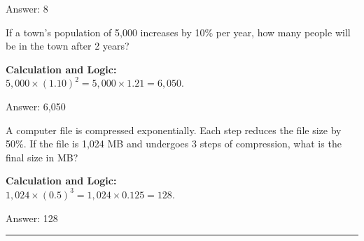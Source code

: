 \documentclass[11pt,paper=a4,answers]{exam}
\begin{document}
\begin{questions}
\begin{solution}
\vspace{25pt}

Answer: \colorbox{yellow!100}{8}
\end{solution}

\vspace{40pt}

\question
If a town's population of 5,000 increases by 10\% per year, how many people will be in the town after 2 years?

\begin{solution}
\textbf{Calculation and Logic:} \\
$5,000 \times (1.10)^2 = 5,000 \times 1.21 = 6,050$.

\vspace{25pt}

Answer: \colorbox{yellow!100}{6,050}
\end{solution}

\vspace{40pt}

\question
A computer file is compressed exponentially. Each step reduces the file size by 50\%. If the file is 1,024 MB and undergoes 3 steps of compression, what is the final size in MB?

\begin{solution}
\textbf{Calculation and Logic:} \\
$1,024 \times (0.5)^3 = 1,024 \times 0.125 = 128$.

\vspace{25pt}

Answer: \colorbox{yellow!100}{128}
\end{solution}



\end{questions}
\begin{center}
\rule{.5\textwidth}{1pt}
\end{center}
\end{document}
